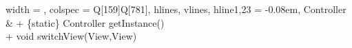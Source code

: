 \begin{longtblr}[
    label = none,
    entry = none,
  ]{
    width = \linewidth,
    colspec = {Q[159]Q[781]},
    hlines,
    vlines,
    hline{1,23} = {-}{0.08em},
  }
  Controller             & {+ \{static\} Controller getInstance()\\+ void switchView(View,View)}                                                                                                                                                                                                                                                                                                                                                                                                                                                                                                                                                                                                                                                                                                                                                                                                                                                                                                                                                                                                                                                                                                                                                                                                                                                                                                                                                                                                                                                                                                                                                                                                                                                                                                                                                                                                                           \\

\end{longtblr}

